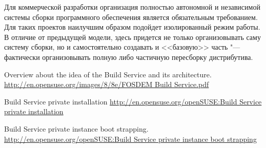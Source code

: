 \documentclass[10pt, a5paper]{article}
\begin{document}
Для коммерческой разработки организация полностью автономной и независимой системы сборки программного обеспечения является обязательным требованием. Для таких проектов наилучшим образом подойдет изолированный режим работы. В отличие от предыдущей модели, здесь придется не только организовывать саму систему сборки, но и самостоятельно создавать 
и <<базовую>> часть \cite{Pynkin3} "--- фактически организовывать полную либо частичную пересборку дистрибутива.


\begin{thebibliography}{9}

 Overview about the idea of the Build Service and its architecture.
\url{http://en.opensuse.org/images/8/8e/FOSDEM Build Service.pdf}

 Build Service private installation \url{http://en.opensuse.org/openSUSE:Build Service private installation}

 Build Service private instance boot strapping.
\url{http://en.opensuse.org/openSUSE:Build Service private instance boot strapping}

\end{thebibliography}
\end{document}
